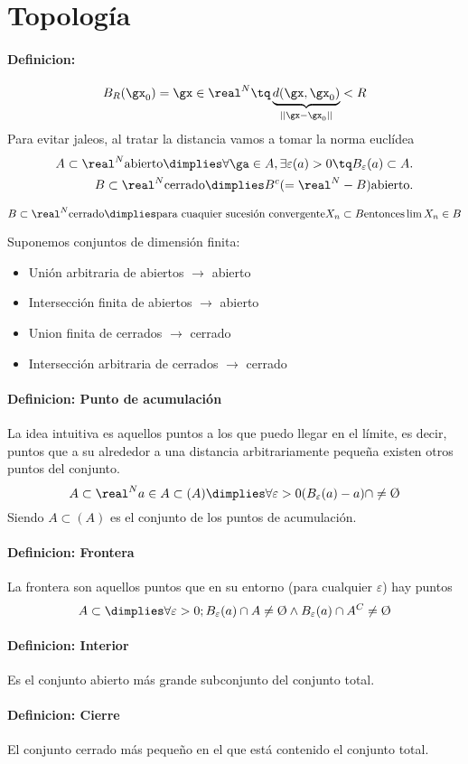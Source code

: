 \documentclass[a4paper,10pt]{apuntes}
\newcommand{\definition}[1]{\paragraph{Definicion: #1\\}}
\begin{document}
\section{Topología}
\definition{}
$$B_R(\gx_0) = {\gx \in \real^N \tq \underbrace{d(\gx,\gx_0)}_{||\gx-\gx_0||} < R }$$
Para evitar jaleos, al tratar la distancia vamos a tomar la norma euclídea
\begin{align*}
A \subset \real^N  \text{abierto} \dimplies \forall \ga\in A, \exists \varepsilon(a) > 0 \tq B_\varepsilon(a) \subset A.\\
B \subset \real^N \text{cerrado} \dimplies B^c(= \real^N-B) \text{abierto}.
\end{align*}
\begin{theorem}
$$B \subset \real^N \text{cerrado} \dimplies \text{para cuaquier sucesión convergente} {X_n} \subset B \text{entonces} \lim X_n \in B$$
 
\end{theorem}
\begin{theorem}
Suponemos conjuntos de dimensión finita:
\begin{itemize}
 \item Unión arbitraria de abiertos $\rightarrow$ abierto
 \item Intersección finita de abiertos $\rightarrow$ abierto
 \item Union finita de cerrados $\rightarrow$ cerrado
 \item Intersección arbitraria de cerrados $\rightarrow$ cerrado
\end{itemize} 
\end{theorem}

\definition{Punto de acumulación}
La idea intuitiva es aquellos puntos a los que puedo llegar en el límite, es decir, puntos que a su alrededor a una distancia arbitrariamente pequeña existen otros puntos del conjunto.
$$A\subset \real^N a \in A \subset(A) \dimplies  \forall \varepsilon > 0 ( B_{\varepsilon} (a) - {a} ) \cap \neq \text{\O} $$
Siendo $A \subset (A)$ es el conjunto de los puntos de acumulación.
\definition{Frontera }%
La frontera son aquellos puntos que en su entorno (para cualquier $\varepsilon$) hay puntos
$$A \subset %
\dimplies \forall \varepsilon>0 ; B_\varepsilon (a) \cap A \neq \text{\O} \wedge B_{\varepsilon} (a) \cap A^C \neq \text{\O} $$
\definition{Interior}
Es el conjunto abierto más grande subconjunto del conjunto total.
\definition{Cierre}
El conjunto cerrado más pequeño en el que está contenido el conjunto total.
\end{document}
